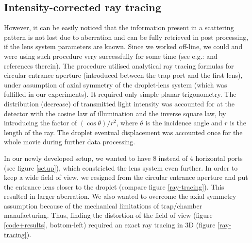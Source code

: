\documentclass[preprint,review,12pt,dvips]{elsarticle}
\begin{document}
\subsection{Intensity-corrected ray tracing} However, it can be easily noticed that the information present in a scattering
pattern is not lost due to aberration and can be fully retrieved in post processing, if the lens system parameters are
known. Since we worked off-line, we could and were using such procedure very successfully for some time (see e.g.:
\cite{RoP,liquids,HK-soft matter,Hi-precission} and references therein). The procedure utilised analytical ray tracing
formulas for circular entrance aperture (introduced between the trap port and the first lens), under assumption of axial
symmetry of the droplet-lens system (which was fulfilled in our experiments). It required only simple planar trigonometry.
The distribution (decrease) of transmitted light intensity was accounted for at the detector with the cosine law of
illumination and the inverse square law, by introducing the factor of $(\cos \theta) /r^2$, where $\theta$ is the
incidence angle and $r$ is the length of the ray. The droplet eventual displacement was accounted once for the whole movie
during further data processing.

In our newly developed setup, we wanted to have 8 instead of 4 horizontal ports (see figure \ref{setup}), which
constricted the lens system even further. In order to keep a wide field of view, we resigned from the circular entrance
aperture and put the entrance lens closer to the droplet (compare figure \ref{ray-tracing}). This resulted in larger
aberration. We also wanted to overcome the axial symmetry assumption because of the mechanical limitations of trap/chamber
manufacturing. Thus, finding the distortion of the field of view (figure \ref{code+results}, bottom-left) required an
exact ray tracing in 3D (figure \ref{ray-tracing}).
\end{document}
